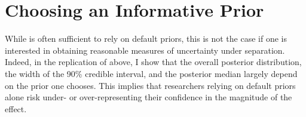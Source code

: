 \documentclass[12pt]{article}
\begin{document}

%


\section*{Choosing an Informative Prior}

While is often sufficient to rely on default priors, this is not the case if one is interested in obtaining reasonable measures of uncertainty under separation. Indeed, in the replication of \cite{BarrilleauxRainey2014} above, I show that the overall posterior distribution, the width of the 90\% credible interval, and the posterior median largely depend on the prior one chooses. This implies that researchers relying on default priors alone risk under- or over-representing their confidence in the magnitude of the effect.
\end{document}
